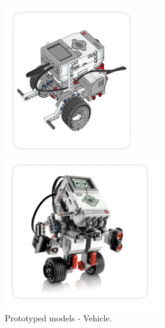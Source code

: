 \documentclass[english]{textolivre}
\begin{document}
\begin{figure}[h!]
 \centering
 \begin{minipage}[t]{.30\textwidth}
 \includegraphics[width=\textwidth]{Fig31.png}
 \caption{Prototyped models - Vehicle.}
 \label{fig31}
 \end{minipage}%
 \qquad
 \begin{minipage}[t]{0.30\textwidth}
 \includegraphics[width=\textwidth]{Fig32.png}

\end{minipage}
\end{figure}
\end{document}
